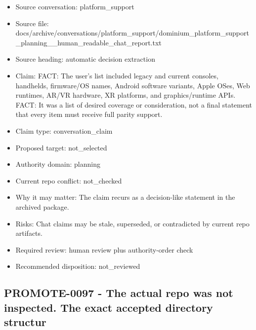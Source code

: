 \documentclass[11pt,a4paper]{report}
\begin{document}
\begin{itemize}
\item Source conversation: platform\_support
\item Source file: docs/archive/conversations/platform\_support/dominium\_platform\_support\_planning\_\_human\_readable\_chat\_report.txt
\item Source heading: automatic decision extraction
\item Claim: FACT: The user's list included legacy and current consoles, handhelds, firmware/OS names, Android software variants, Apple OSes, Web runtimes, AR/VR hardware, XR platforms, and graphics/runtime APIs. FACT: It was a list of desired coverage or consideration, not a final statement that every item must receive full parity support.
\item Claim type: conversation\_claim
\item Proposed target: not\_selected
\item Authority domain: planning
\item Current repo conflict: not\_checked
\item Why it may matter: The claim recurs as a decision-like statement in the archived package.
\item Risks: Chat claims may be stale, superseded, or contradicted by current repo artifacts.
\item Required review: human review plus authority-order check
\item Recommended disposition: not\_reviewed
\end{itemize}

\subsection{PROMOTE-0097 - The actual repo was not inspected. The exact accepted directory structur}
\end{document}
